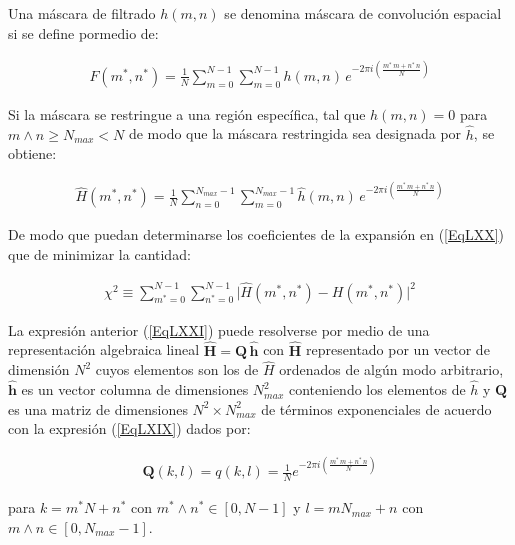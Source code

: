 Una m\'ascara de filtrado $h(m, n)$ se denomina m\'ascara de convoluci\'on espacial si se define pormedio de:

\begin{eqnarray}
	F(m^*, n^*) = \frac{1}{N} \sum _{m=0}^{N-1} \sum _{m=0}^{N-1} h(m, n) \, e^{-2 \pi i \left( \frac{m^* \, m + n^* \, n}{N} \right)}
\label{EqLXIX}
\end{eqnarray}

Si la m\'ascara se restringue a una regi\'on espec\'ifica, tal que $h(m, n) = 0$ para $m \wedge n \ge N_{max} < N$ de modo que la m\'ascara restringida 
sea designada por $\hat{h}$, se obtiene:

\begin{eqnarray}
	\hat{H}(m^*, n^*) = \frac{1}{N} \sum _{n=0}^{N_{max}-1} \sum _{m=0}^{N_{max}-1} \hat{h}(m, n) \, 
	e^{-2 \pi i \left( \frac{m^* \, m + n^* \, n}{N} \right)}
\label{EqLXX}
\end{eqnarray}

De modo que puedan determinarse los coeficientes de la expansi\'on en (\ref{EqLXX}) que de minimizar la cantidad:

\begin{eqnarray}
	\chi^2 \equiv \sum _{m^*=0}^{N-1} \sum _{n^*=0}^{N-1} \lvert \hat{H}(m^*, n^*) - H(m^*, n^*) \rvert^2
\label{EqLXXI}
\end{eqnarray}

La expresi\'on anterior (\ref{EqLXXI}) puede resolverse por medio de una representaci\'on algebraica lineal $\mathbf{\hat{H}} = \mathbf{Q} \, \mathbf{\hat{h}}$ 
con $\mathbf{\hat{H}}$ representado por un vector de dimensi\'on $N^2$ cuyos elementos son los de $\hat{H}$ ordenados de alg\'un modo arbitrario, 
$\mathbf{\hat{h}}$ es un vector columna de dimensiones $N_{max}^2$ conteniendo los elementos de $\hat{h}$ y $\mathbf{Q}$ es una matriz de dimensiones
$N^2 \times N_{max}^2$ de t\'erminos exponenciales de acuerdo con la expresi\'on (\ref{EqLXIX}) dados por:

\begin{eqnarray}
	\mathbf{Q}(k, l) = q(k, l) = \frac{1}{N} e^{-2 \pi i \left( \frac{m^* \, m + n^* \, n}{N} \right)}
\label{EqLXXII}
\end{eqnarray}

para $k= m^* N + n^*$ con $m^* \wedge n^* \in [0, N-1]$ y $l= m N_{max} + n$ con $m \wedge n \in [0, N_{max}-1]$.


